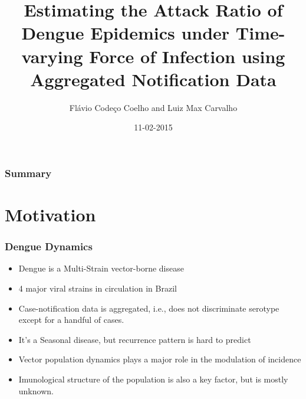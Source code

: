 \documentclass[10pt,compress,notheorems]{beamer}
\author{Flávio Codeço Coelho and Luiz Max Carvalho}
\title{Estimating the Attack Ratio of Dengue Epidemics under Time-varying 
Force of Infection using Aggregated Notification Data}
\date{11-02-2015}
\institute [EMAp, FGV]{Escola de Matemática Aplicada,   Fundação Getúlio Vargas}
\begin{document}
 \begin{frame}
\titlepage
\end{frame}

\begin{frame}[fragile]
\frametitle{Summary}
\tableofcontents
\end{frame}

\section{Motivation}
\begin{frame}
\frametitle{Dengue Dynamics}
\begin{itemize}[<+->]
  \item Dengue is a Multi-Strain  vector-borne disease
  \item 4 major viral strains in circulation in Brazil
  \item Case-notification data is aggregated, i.e., does not discriminate 
serotype except for a handful of cases.
  \item It's a Seasonal disease, but recurrence pattern is hard to predict
  \item Vector population dynamics plays a major role in the modulation of 
incidence
  \item Imunological structure of the population is also a key factor, but is 
mostly unknown.
\end{itemize}
\end{frame}
\end{document}
